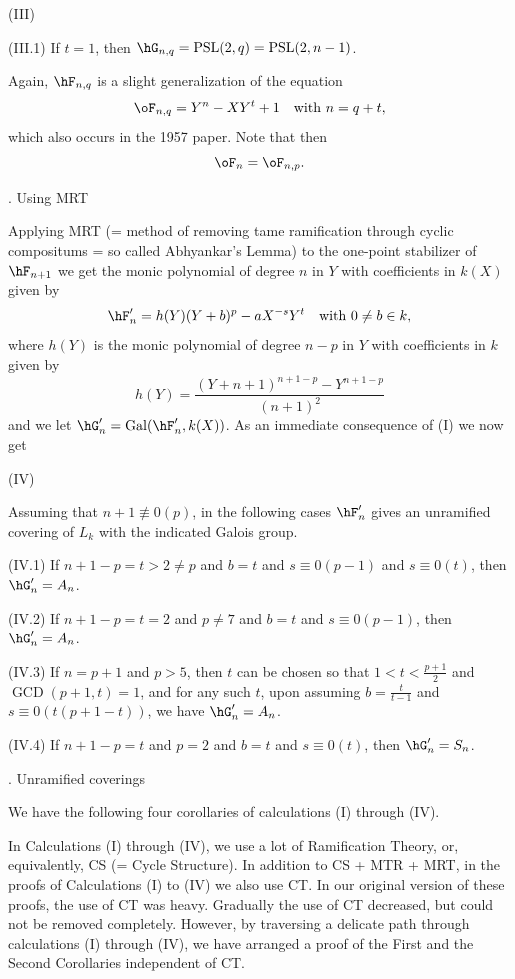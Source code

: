 \heading (III)\endheading

(III.1) If $t=1$, then $\hG_{n,q}=\operatorname{PSL}(2,q)=%
\operatorname{PSL}(2,n-1)$.

Again, $\hF_{n,q}$ is a slight generalization of the 
equation
$$
\oF_{n,q}=Y^n-XY^t+1\quad\text{with }n=q+t,
$$
which also occurs in the 1957 paper. Note that then
$$
\oF_n=\oF_{n,p}.
$$

. Using MRT\endheading

Applying MRT (= method of removing tame ramification 
through cyclic
compositums = so called Abhyankar's Lemma) to the 
one-point stabilizer of 
$\hF_{n+1}$ we get the monic polynomial of degree $n$ in 
$Y$ with
coefficients in $k(X)$ given by
$$
\hF'_n=h(Y)(Y+b)^p-aX^{-s}Y^t\quad\text{with } 0\neq b\in k,
$$
where $h(Y)$ is the monic polynomial of degree $n-p$ in 
$Y$ with coefficients 
in $k$ given by
$$
h(Y)=\frac{(Y+n+1)^{n+1-p}-Y^{n+1-p}}{(n+1)^2}
$$
and we let $\hG'_n=\operatorname{Gal}(\hF'_n,k(X))$. 
As an immediate consequence of (I) we now get

\heading (IV)\endheading

Assuming that $n+1\not\equiv 0(p)$, in the following cases
$\hF'_n$ gives an unramified covering of $L_k$ with the 
indicated Galois group.

(IV.1) If $n+1-p=t>2\neq p$ and $b=t$ and $s\equiv 0(p-1)$ 
and $s\equiv 0(t)$, 
then $\hG'_n=A_n$.

(IV.2) If $n+1-p=t=2$ and $p\neq 7$ and $b=t$ and $s\equiv 
0(p-1)$, 
then $\hG'_n=A_n$.

(IV.3) If $n=p+1$ and $p>5$, then $t$ can be chosen so 
that $1<t<\frac{p+1}{2}$
and $\operatorname{GCD}(p+1,t)=1$, and for any such $t$, 
upon assuming
$b=\frac{t}{t-1}$ and $s\equiv 0(t(p+1-t))$, we have 
$\hG'_n=A_n$. 

(IV.4) If $n+1-p=t$ and $p=2$ and $b=t$ and $s\equiv 0(t)$, 
then $\hG'_n=S_n$.


. Unramified coverings\endheading

We have the following four corollaries of calculations (I) 
through (IV).

In Calculations (I) through (IV), we use a lot of 
Ramification Theory, or,
equivalently, CS (= Cycle Structure). In addition to CS + 
MTR + MRT,
in the proofs of Calculations (I) to (IV) we also use CT.
In our original version of these proofs, the use of CT was 
heavy. 
Gradually the use of CT decreased, but could not be 
removed completely.
However, by traversing a delicate path through 
calculations (I) through (IV),
we have arranged a proof of the First and the Second 
Corollaries independent
of CT.

